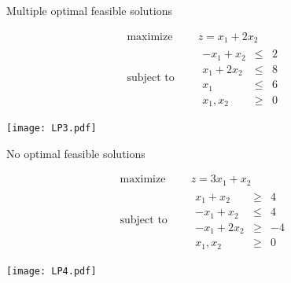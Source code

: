 \documentclass[c]{beamer}
\begin{document}
\begin{frame}[allowframebreaks]{Multiple optimal feasible solutions}
  \begin{Exercise}
    \begin{equation*}
      \begin{aligned}
        \text{maximize } \quad & z = x_1 + 2x_2 \\
        \text{subject to }\quad &
        \begin{array}{rcl}
          -x_1+x_2 & \leq & 2\\
          x_1 + 2x_2 &\leq& 8\\
          x_1 &\leq& 6\\
          x_1,x_2 &\geq &0
        \end{array}
      \end{aligned}
    \end{equation*}
  \end{Exercise}
 \framebreak
  \begin{center}
   \texttt{[image: LP3.pdf]}
  \end{center}

\end{frame}

\begin{frame}[allowframebreaks]{No optimal feasible solutions}
  \begin{Exercise}
    \begin{equation*}
      \begin{aligned}
        \text{maximize } \quad & z = 3x_1 + x_2 \\
        \text{subject to }\quad &
        \begin{array}{rcl}
          x_1+x_2 & \geq & 4\\
          -x_1 + x_2 &\leq& 4\\
          -x_1 +2x_2 &\geq& -4\\
          x_1,x_2 &\geq &0
        \end{array}
      \end{aligned}
    \end{equation*}
  \end{Exercise}
  \framebreak
  \begin{center}
   \texttt{[image: LP4.pdf]}
  \end{center}

\end{frame}
\end{document}
